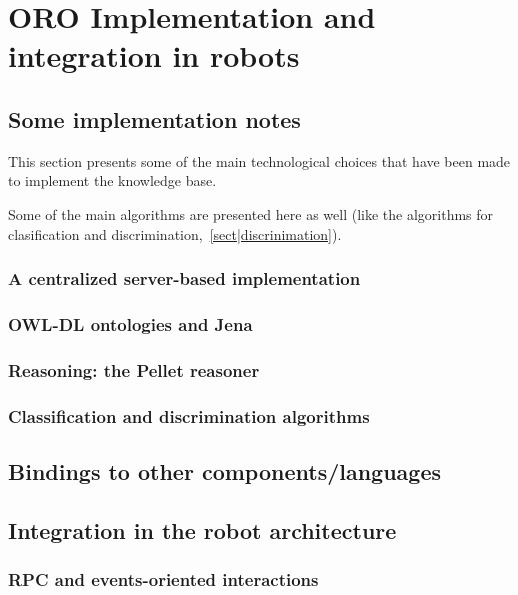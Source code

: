 \chapter{ORO Implementation and integration in robots}
\label{chapter|implementation_integration}

\section{Some implementation notes}

This section presents some of the main technological choices that have
been made to implement the knowledge base.

Some of the main algorithms are presented here as well (like the algorithms for clasification and discrimination,~\ref{sect|discrinimation}).

\subsection{A centralized server-based implementation}
\label{sect|oro-serverbased}


\subsection{OWL-DL ontologies and Jena}
\label{sect|jena}

\subsection{Reasoning: the Pellet reasoner}
\label{sect|pellet}

\subsection{Classification and discrimination algorithms}
\label{sect|discrimination}

\section{Bindings to other components/languages}
\label{sect|interfacing}

\section{Integration in the robot architecture}

\subsection{RPC and events-oriented interactions}

